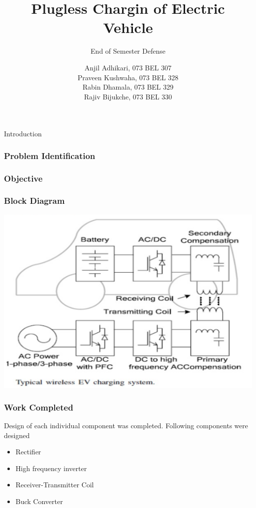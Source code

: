 \documentclass{beamer}
\title[Short Paper Title] %
{Plugless Chargin of Electric Vehicle}
\subtitle
{End of Semester Defense} %
\author[]{Anjil Adhikari, 073 BEL 307 \\
Praveen Kushwaha, 073 BEL 328 \\
Rabin Dhamala, 073 BEL 329 \\
Rajiv Bijukche, 073 BEL 330 
}
\begin{document}
\frame{\titlepage}



\begin{frame}{Introduction}

\end{frame}

\begin{frame}
  \frametitle{Problem Identification}
\end{frame}

\begin{frame}
\frametitle{Objective}

\end{frame}

\begin{frame}
  \begin{center}
  \frametitle{Block Diagram}
\includegraphics[scale=0.5]{jpgs/wirelessEV.PNG}
  \end{center}
\end{frame}

\begin{frame}
  \frametitle{Work Completed}
  Design of each individual component was completed. Following components were designed
  \begin{itemize}
    \item Rectifier
    \item High frequency inverter
    \item Receiver-Transmitter Coil
    \item Buck Converter
  \end{itemize}
\end{frame}
\end{document}
